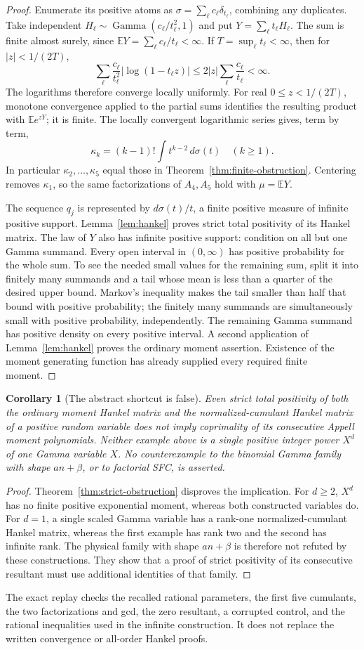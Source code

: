 \documentclass[11pt]{article}
\newtheorem{corollary}[theorem]{Corollary}
\newcommand{\E}{\mathbb E}
\begin{document}
\begin{proof}
Enumerate its positive atoms as
$\sigma=\sum_\ell c_\ell\delta_{t_\ell}$, combining any duplicates.
Take independent
$H_\ell\sim\operatorname{Gamma}(c_\ell/t_\ell^2,1)$ and put
$Y=\sum_\ell t_\ell H_\ell$.
The sum is finite almost surely, since
$\E Y=\sum_\ell c_\ell/t_\ell<\infty$.
If $T=\sup_\ell t_\ell<\infty$, then for $|z|<1/(2T)$,
\[
 \sum_\ell \frac{c_\ell}{t_\ell^2}
                \bigl|\log(1-t_\ell z)\bigr|
 \le 2|z|\sum_\ell\frac{c_\ell}{t_\ell}<\infty .
\]
The logarithms therefore converge locally uniformly. For real
$0\le z<1/(2T)$, monotone convergence applied to the partial sums
identifies the resulting product with $\E e^{zY}$; it is finite.
The locally convergent logarithmic series gives, term by term,
\[
 \kappa_k=(k-1)!\int t^{k-2}\,d\sigma(t)\quad(k\ge1).
\]
In particular $\kappa_2,\ldots,\kappa_5$ equal those in
Theorem~\ref{thm:finite-obstruction}. Centering removes $\kappa_1$,
so the same factorizations of $A_4,A_5$ hold with $\mu=\E Y$.

The sequence $q_j$ is represented by $d\sigma(t)/t$, a finite
positive measure of infinite positive support. Lemma~\ref{lem:hankel}
proves strict total positivity of its Hankel matrix.
The law of $Y$ also has infinite positive support: condition on all
but one Gamma summand. Every open interval in $(0,\infty)$ has
positive probability for the whole sum. To see the needed small
values for the remaining sum, split it into finitely many summands
and a tail whose mean is less than a quarter of the desired upper
bound. Markov's inequality makes the tail smaller than half that
bound with positive probability; the finitely many summands are
simultaneously small with positive probability, independently.
The remaining Gamma summand has positive density on every positive
interval. A second application of Lemma~\ref{lem:hankel} proves the
ordinary moment assertion. Existence of the moment generating
function has already supplied every required finite moment.
\end{proof}

\begin{corollary}[The abstract shortcut is false]\label{cor:scope}
Even strict total positivity of both the ordinary moment Hankel
matrix and the normalized-cumulant Hankel matrix of a positive
random variable does not imply coprimality of its consecutive
Appell moment polynomials.
Neither example above is a single positive integer power $X^d$ of
one Gamma variable $X$. No counterexample to the binomial Gamma
family with shape $an+\beta$, or to factorial SFC, is asserted.
\end{corollary}
\begin{proof}
Theorem~\ref{thm:strict-obstruction} disproves the implication.
For $d\ge2$, $X^d$ has no finite positive exponential moment,
whereas both constructed variables do.
For $d=1$, a single scaled Gamma variable has a rank-one
normalized-cumulant Hankel matrix, whereas the first example has
rank two and the second has infinite rank.
The physical family with shape $an+\beta$ is therefore not
refuted by these constructions. They show that a proof of strict
positivity of its consecutive resultant must use additional
identities of that family.
\end{proof}

The exact replay checks the recalled rational parameters, the first five
cumulants, the two factorizations and gcd, the zero resultant, a
corrupted control, and the rational inequalities used in the infinite
construction. It does not replace the written convergence or
all-order Hankel proofs.
\end{document}
